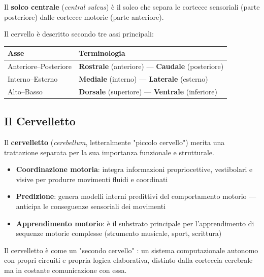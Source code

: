 \noindent Il \textbf{solco centrale} (\textit{central sulcus}) è il solco che separa le cortecce sensoriali (parte posteriore) dalle cortecce motorie (parte anteriore).




\noindent Il cervello è descritto secondo tre assi principali:

\begin{table}[htbp]
    \centering
    \renewcommand{\arraystretch}{1.3}
    \begin{tabularx}{\textwidth}{|l|X|}
    \hline
    \textbf{Asse} & \textbf{Terminologia} \\
    \hline
    Anteriore–Posteriore & \textbf{Rostrale} (anteriore) — \textbf{Caudale} (posteriore) \\
    Interno–Esterno & \textbf{Mediale} (interno) — \textbf{Laterale} (esterno) \\
    Alto–Basso & \textbf{Dorsale} (superiore) — \textbf{Ventrale} (inferiore) \\
    \hline
    \end{tabularx}
\end{table}







\subsection{Il Cervelletto}

Il \textbf{cervelletto} (\textit{cerebellum}, letteralmente "piccolo cervello") merita una trattazione separata per la sua importanza funzionale e strutturale.



\begin{itemize}
    \item \textbf{Coordinazione motoria}: integra informazioni propriocettive, vestibolari e visive per produrre movimenti fluidi e coordinati
    \item \textbf{Predizione}: genera modelli interni predittivi del comportamento motorio — anticipa le conseguenze sensoriali dei movimenti
    \item \textbf{Apprendimento motorio}: è il substrato principale per l'apprendimento di sequenze motorie complesse (strumento musicale, sport, scrittura)
\end{itemize}

\begin{tcolorbox}[colback=gray!5, colframe=gray!40, arc=2mm, boxrule=0.5pt]
Il cervelletto è come un "secondo cervello" : un sistema computazionale autonomo con propri circuiti e propria logica elaborativa, distinto dalla corteccia cerebrale ma in costante comunicazione con essa.
\end{tcolorbox}


